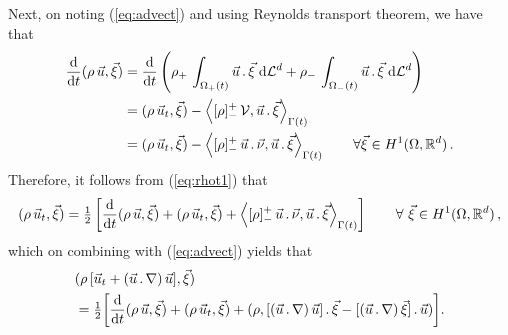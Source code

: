 \documentclass[a4paper,12pt,onecolumn]{article}
\newcommand{\dL}[1]{\;{\rm d}{\cal L}^{#1}} %
\newcommand{\ddt}{\frac{\rm d}{{\rm d}t}}
\begin{document}
Next, on noting (\ref{eq:advect}) and using Reynolds transport theorem,
we have that
\begin{align}
\ddt(\rho \,\vec u, \vec \xi) & =
\ddt\left(\rho_+\,\int_{\Omega_+(t)} \vec u \,.\,\vec \xi \dL{d}
+ \rho_-\,\int_{\Omega_-(t)} \vec u\,.\,\vec \xi \dL{d}  \right) \nonumber \\
& =  (\rho\,\vec u_t, \vec \xi)
-\left\langle [\rho]_-^+\,\mathcal{V}, \vec u \,.\,\vec \xi
\right\rangle_{\Gamma(t)} \nonumber \\
&= (\rho\,\vec u_t, \vec \xi)- \left\langle [\rho]_-^+\,\vec u\,.\,\vec \nu,
\vec u \,.\,\vec \xi \right\rangle_{\Gamma(t)}
\qquad \forall \vec \xi \in H^1(\Omega, {\mathbb R}^d)\,.
\label{eq:rhot1}
\end{align}
Therefore, it follows from (\ref{eq:rhot1}) that
\begin{equation*}
(\rho\,\vec u_t, \vec \xi) =
\tfrac{1}{2} \left[
\ddt (\rho\,\vec u,\vec \xi) + (\rho\,\vec u_t, \vec \xi)
+ \left\langle [\rho]_-^+\,\vec u\,.\,\vec \nu,
\vec u \,.\,\vec \xi \right\rangle_{\Gamma(t)}
\right]
\qquad \forall\ \vec \xi \in H^1(\Omega, {\mathbb R}^d)\,,
\end{equation*}
which on combining with (\ref{eq:advect}) yields that
\begin{align} \label{eq:rhot3}
& (\rho\,[\vec u_t + (\vec u\,.\,\nabla)\,\vec u], \vec \xi) \nonumber \\
& = \tfrac{1}{2}\bigg[ \ddt (\rho\,\vec u, \vec \xi)
+ (\rho\,\vec u_t, \vec \xi) + (\rho, [(\vec u\,.\,\nabla)\,\vec u]\,.\,\vec \xi
- [(\vec u\,.\,\nabla)\,\vec \xi]\,.\,\vec u) \bigg].
\end{align}
\end{document}
